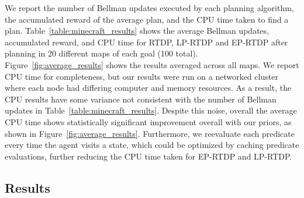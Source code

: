 \documentclass[11pt]{article}
\begin{document}
We report the number of Bellman updates executed by each planning
algorithm, the accumulated reward of the average plan, and the CPU
time taken to find a plan. Table~\ref{table:minecraft_results} shows
the average Bellman updates, accumulated reward, and CPU time for
RTDP, LP-RTDP and EP-RTDP after planning in 20 different maps of each
goal (100 total). Figure~\ref{fig:average_results} shows the
results averaged across all maps.  We report CPU time for
completeness, but our results were run on a networked cluster where
each node had differing computer and memory resources. As a result,
the CPU results have some variance not consistent with the number of
Bellman updates in Table~\ref{table:minecraft_results}.  Despite this
noise, overall the average CPU time shows statistically significant
improvement overall with our priors, as shown in
Figure~\ref{fig:average_results}. Furthermore, we reevaluate each
predicate every time the agent visits a state, which could be optimized by caching predicate evaluations, further
reducing the CPU time taken for EP-RTDP and LP-RTDP.

\subsection{Results}
\end{document}
